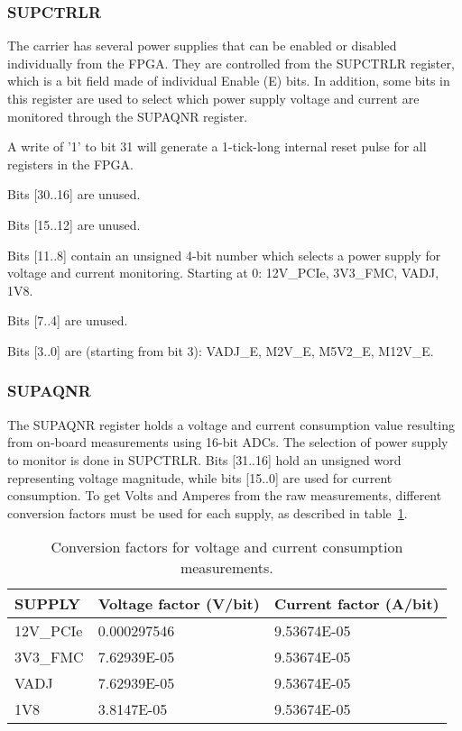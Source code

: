 \documentclass{article}
\newenvironment{packed_item}{
\begin{itemize}
  \setlength{\itemsep}{1pt}
  \setlength{\parskip}{0pt}
  \setlength{\parsep}{0pt}
}{\end{itemize}}
\begin{document}
\subsubsection{SUPCTRLR}
The carrier has several power supplies that can be enabled or disabled individually from the FPGA. They are controlled from the SUPCTRLR register, which is a bit field made of individual Enable (E) bits. In addition, some bits in this register are used to select which power supply voltage and current are monitored through the SUPAQNR register.
\begin{packed_item}
\item A write of '1' to bit 31 will generate a 1-tick-long internal reset pulse for all registers in the FPGA. 
\item Bits [30..16] are unused.
\item Bits [15..12] are unused.
\item Bits [11..8] contain an unsigned 4-bit number which selects a power supply for voltage and current monitoring. Starting at 0: 12V\_PCIe, 3V3\_FMC, VADJ, 1V8.
\item Bits [7..4] are unused.
\item Bits [3..0] are (starting from bit 3): VADJ\_E, M2V\_E, M5V2\_E, M12V\_E.
\end{packed_item}

\subsubsection{SUPAQNR}
The SUPAQNR register holds a voltage and current consumption value resulting from on-board measurements using 16-bit ADCs. The selection of power supply to monitor is done in SUPCTRLR. Bits [31..16] hold an unsigned word representing voltage magnitude, while bits [15..0] are used for current consumption. To get Volts and Amperes from the raw measurements, different conversion factors must be used for each supply, as described in table~\ref{tab:conv_fact}.

\begin{table}[htbp]
  \centering
  \begin{tabularx}{\textwidth}{|X|l|l|}
    \hline
    \textbf{SUPPLY} & \textbf{Voltage factor (V/bit)} & \textbf{Current factor (A/bit)} \\
    \hline
    \hline
    12V\_PCIe & 0.000297546 & 9.53674E-05 \\
    \hline
    3V3\_FMC & 7.62939E-05 & 9.53674E-05 \\
    \hline
    VADJ & 7.62939E-05 & 9.53674E-05 \\
    \hline
    1V8 & 3.8147E-05 & 9.53674E-05 \\
    \hline
  \end{tabularx}
  \caption{Conversion factors for voltage and current consumption measurements.}
  \label{tab:conv_fact}
\end{table}
\end{document}
